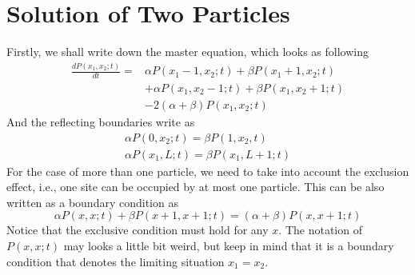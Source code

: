 \documentclass[12pt,a4paper]{article}
\begin{document}
\section{Solution of Two Particles}
\label{sec:solution_of_two_particles}
Firstly, we shall write down the master equation, which looks as following
\begin{equation}
    \begin{aligned}
    \label{eq:masterEqTwo}
    \frac{d P(x_1, x_2; t)}{dt} = & \alpha P(x_1-1,x_2;t) + \beta P(x_1+1,x_2;t) \\ 
    & + \alpha P(x_1, x_2-1; t) + \beta P(x_1, x_2+1; t)  \\ 
    & - 2(\alpha+\beta)P(x_1, x_2; t)
    \end{aligned}
\end{equation}
And the reflecting boundaries write as
\begin{subequations}
    \label{eq:boundaries-two-particles}
    \begin{eqnarray}
        \alpha P(0,x_2; t) = \beta P(1, x_2, t) \\
        \alpha P(x_1, L;t) = \beta P(x_1, L+1;t)
    \end{eqnarray}
\end{subequations}
For the case of more than one particle, we need to take into account the
exclusion effect, i.e., one site can be occupied by at most one particle.
This can be also written as a boundary condition as 
\begin{equation}
    \label{eq:exclusionCondition}
    \alpha P(x, x; t) + \beta P(x+1, x+1; t) = (\alpha + \beta) P(x, x+1; t)
\end{equation}
Notice that the exclusive condition must hold for any $x$. The notation of $P(x,
x; t)$ may looks a little bit weird, but keep in mind that it is a boundary condition
that denotes the limiting situation $x_1=x_2$.
\end{document}
